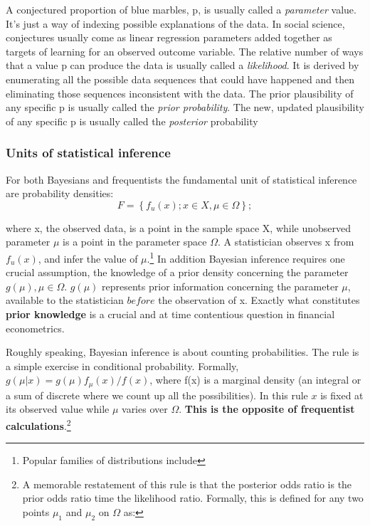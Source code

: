 \documentclass{article}
\begin{document}
A conjectured proportion of blue marbles, p, is usually called a
\emph{parameter} value. It's just a way of indexing possible
explanations of the data. In social science, conjectures usually come as
linear regression parameters added together as targets of learning for
an observed outcome variable. The relative number of ways that a value p
can produce the data is usually called a \emph{likelihood}. It is
derived by enumerating all the possible data sequences that could have
happened and then eliminating those sequences inconsistent with the
data. The prior plausibility of any specific p is usually called the
\emph{prior probability}. The new, updated plausibility of any specific
p is usually called the \emph{posterior} probability

\hypertarget{units-of-statistical-inference}{%
\subsubsection{Units of statistical
inference}\label{units-of-statistical-inference}}

For both Bayesians and frequentists the fundamental unit of statistical
inference are probability densities:
\[F=\left\{f_u(x);x \in X,\mu \in \Omega \right\};\]

where x, the observed data, is a point in the sample space X, while
unobserved parameter \(\mu\) is a point in the parameter space
\(\Omega\). A statistician observes x from \(f_u(x)\), and infer the
value of \(\mu\).\footnote{Popular families of distributions include} In
addition Bayesian inference requires one crucial assumption, the
knowledge of a prior density concerning the parameter
\(g(\mu),\mu \in \Omega\). \(g(\mu)\) represents prior information
concerning the parameter \(\mu\), available to the statistician
\(before\) the observation of x. Exactly what constitutes \textbf{prior
knowledge} is a crucial and at time contentious question in financial
econometrics.

Roughly speaking, Bayesian inference is about counting probabilities.
The rule is a simple exercise in conditional probability. Formally,
\(g(\mu|x)=g(\mu)f_{\mu}(x)/f(x)\), where f(x) is a marginal density (an
integral or a sum of discrete where we count up all the possibilities).
In this rule \(x\) is fixed at its observed value while \(\mu\) varies
over \(\Omega\). \textbf{This is the opposite of frequentist
calculations}.\footnote{A memorable restatement of this rule is that the
  posterior odds ratio is the prior odds ratio time the likelihood
  ratio. Formally, this is defined for any two points \(\mu_1\) and
  \(\mu_2\) on \(\Omega\) as:}
\end{document}
